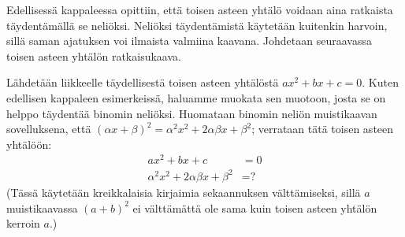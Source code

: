 
Edellisessä kappaleessa opittiin, että toisen asteen yhtälö voidaan aina ratkaista täydentämällä se neliöksi.
Neliöksi täydentämistä käytetään kuitenkin harvoin, sillä saman ajatuksen voi ilmaista valmiina kaavana.
Johdetaan seuraavassa toisen asteen yhtälön ratkaisukaava.

Lähdetään liikkeelle täydellisestä toisen asteen yhtälöstä $ax^2+bx+c=0$. Kuten edellisen kappaleen esimerkeissä, haluamme muokata sen muotoon, josta se on helppo täydentää binomin neliöksi. Huomataan binomin neliön muistikaavan sovelluksena, että $(\alpha x + \beta)^2 = \alpha^2 x^2 + 2\alpha\beta x +\beta^2$; verrataan tätä toisen asteen yhtälöön:
\begin{align*}
ax^2+bx+c &= 0 \\
\alpha^2 x^2 + 2\alpha\beta x +\beta^2 &= \text{?}
\end{align*}
(Tässä käytetään kreikkalaisia kirjaimia sekaannuksen välttämiseksi, sillä $a$ muistikaavassa $(a + b)^2$ ei välttämättä ole sama kuin toisen asteen yhtälön kerroin $a$.)

